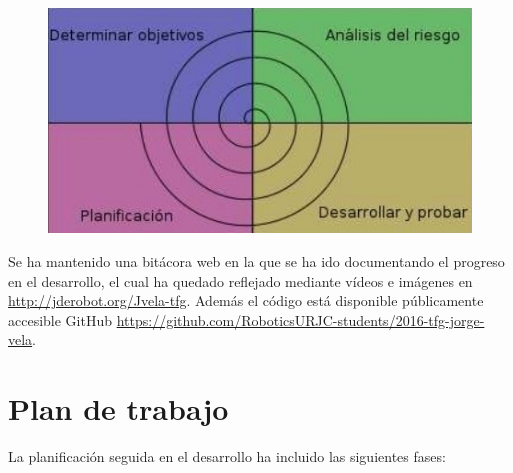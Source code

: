 \begin{figure}[H]
	\centering
		\includegraphics{imgs/metodologia-espiral.jpg}
	\label{fig:Desarrollo en espiral}
\end{figure}

\hspace{1 cm} Se ha mantenido una bit\'acora web en la que se ha ido documentando el progreso en el desarrollo, el cual ha quedado reflejado mediante v\'ideos e im\'agenes en \href{http://jderobot.org/Jvela-tfg}{http://jderobot.org/Jvela-tfg}. Adem\'as el c\'odigo est\'a disponible p\'ublicamente accesible GitHub \href{https://github.com/RoboticsURJC-students/2016-tfg-jorge-vela}{https://github.com/RoboticsURJC-students/2016-tfg-jorge-vela}.



\section{Plan de trabajo}
La planificaci\'on seguida en el desarrollo ha incluido las siguientes fases:

